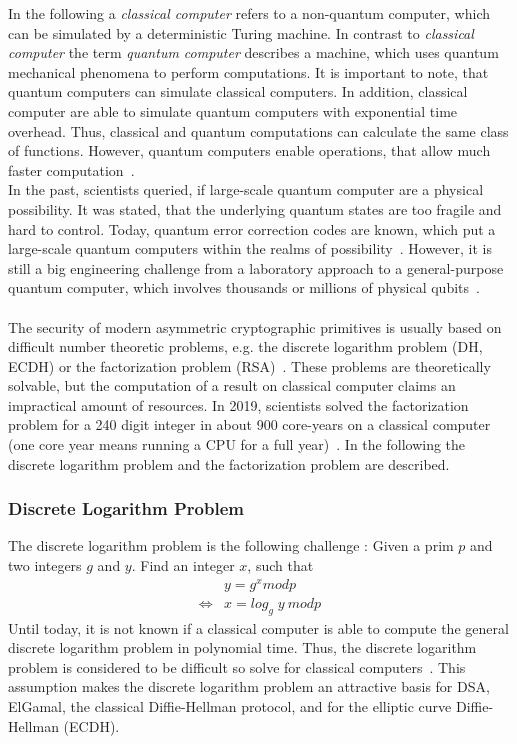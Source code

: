 In the following a \textit{classical computer} refers to a non-quantum computer, which can be simulated by a deterministic Turing machine. In contrast to \textit{classical computer} the term \textit{quantum computer} describes a machine, which uses quantum mechanical phenomena to perform computations. It is important to note, that quantum computers can simulate classical computers. In addition, classical computer are able to simulate quantum computers with exponential time overhead. Thus, classical and quantum computations can calculate the same class of functions. However, quantum computers enable operations, that allow much faster computation~\parencite{nielsen2002quantum}.\\
In the past, scientists queried, if large-scale quantum computer are a physical possibility. It was stated, that the underlying quantum states are too fragile and hard to control. \parencite{chen2016report} Today, quantum error correction codes are known, which put a large-scale quantum computers within the realms of possibility~\parencite{lidar2013quantum}. However, it is still a big engineering challenge from a laboratory approach to a general-purpose quantum computer, which involves thousands or millions of physical qubits~\parencite{chen2016report}.
\\\\
The security of modern asymmetric cryptographic primitives is usually based on difficult number theoretic problems, e.g. the discrete logarithm problem (DH, ECDH) or the factorization problem (RSA)~\parencite{chen2016report}. These problems are theoretically solvable, but the computation of a result on classical computer claims an impractical amount of resources. In 2019, scientists solved the factorization problem for a 240 digit integer in about 900 core-years on a classical computer (one core year means running a CPU for a full year)~\parencite{boudot2795}. In the following the discrete logarithm problem and the factorization problem are described.

\subsubsection{Discrete Logarithm Problem} \label{discrete_log_problem}
The discrete logarithm problem is the following challenge \parencite{beutelspacher2010diskrete}: Given a prim $p$ and two integers $g$ and $y$. Find an integer $x$, such that
\begin{equation*}
\begin{split}
&y = g^x mod p \\
\iff &x = log_g\;y\:mod p
\end{split}
\end{equation*}
Until today, it is not known if a classical computer is able to compute the general discrete logarithm problem in polynomial time. Thus, the discrete logarithm problem is considered to be difficult so solve for classical computers~\parencite{beutelspacher2010diskrete}. This assumption makes the discrete logarithm problem an attractive basis for DSA, ElGamal, the classical Diffie-Hellman protocol, and for the elliptic curve Diffie-Hellman (ECDH).


